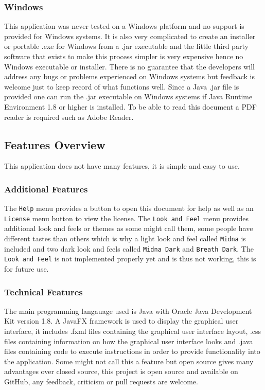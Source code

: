 \documentclass[11pt]{article}
\newcommand{\code}[1]{\texttt{#1}}
\begin{document}
			\subsubsection{Windows}
				This application was never tested on a Windows platform and no support is provided for Windows systems. It is also very complicated to create an installer or portable .exe for Windows from a .jar executable and the little third party software that exists to make this process simpler is very expensive hence no Windows executable or installer. There is no guarantee that the developers will address any bugs or problems experienced on Windows systems but feedback is welcome just to keep record of what functions well. Since a Java .jar file is provided one can run the .jar executable on Windows systems if Java Runtime Environment 1.8 or higher is installed. To be able to read this document a PDF reader is required such as Adobe Reader.

		\subsection{Features Overview}
			This application does not have many features, it is simple and easy to use.

			\subsubsection{Additional Features}
				The \code{Help} menu provides a button to open this document for help as well as an \code{License} menu button to view the license. The \code{Look and Feel} menu provides additional look and feels or themes as some might call them, some people have different tastes than others which is why a light look and feel called \code{Midna} is included and two dark look and feels called \code{Midna Dark} and \code{Breath Dark}. The \code{Look and Feel} is not implemented properly yet and is thus not working, this is for future use.

			\subsubsection{Technical Features}
				The main programming langauage used is Java with Oracle Java Development Kit version 1.8. A JavaFX framework is used to display the graphical user interface, it includes .fxml files containing the graphical user interface layout, .css files containing information on how the graphical user interface looks and .java files containing code to execute instructions in order to provide functionality into the application. Some might not call this a feature but open source gives many advantages over closed source, this project is open source and available on GitHub, any feedback, criticism or pull requests are welcome.
\end{document}
